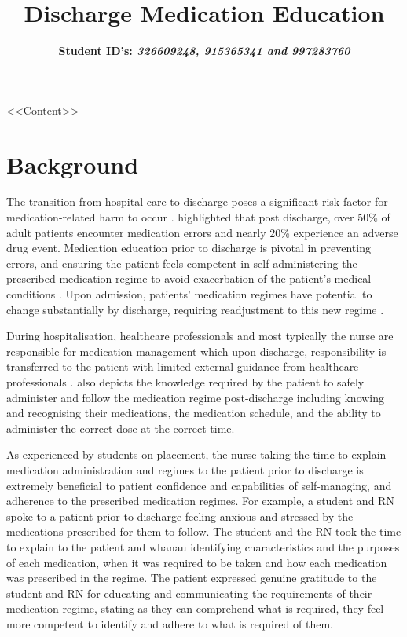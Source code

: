 \documentclass[british,12pt,a4paper]{article}
\title{{\fontsize{14}{15} \textbf{Discharge Medication Education}}\vspace{-1em}}
\author{{\fontsize{14}{15} \textbf{Student ID's: \textit{326609248, 915365341 and 997283760 }}}}
\date{}
\begin{document}
	\maketitle
	\thispagestyle{fancy}
	<<Content>>
	\section{Background}
	The transition from hospital care to discharge poses a significant risk factor for medication-related harm to occur \parencite{Flatman2021}. \textcite{Alqenae2020} highlighted that post discharge, over 50\% of adult patients encounter medication errors and nearly 20\% experience an adverse drug event. Medication education prior to discharge is pivotal in preventing errors, and ensuring the patient feels competent in self-administering the prescribed medication regime to avoid exacerbation of the patient's medical conditions \parencite{Hajialibeigloo2021}. Upon admission, patients' medication regimes have potential to change substantially by discharge, requiring readjustment to this new regime \parencite{Weir2020}. 

	During hospitalisation, healthcare professionals and most typically the nurse are responsible for medication management which upon discharge, responsibility is transferred to the patient with limited external guidance from healthcare professionals \parencite{Mortelmans2021}. \citeauthor{Mortelmans2021} also depicts the knowledge required by the patient to safely administer and follow the medication regime post-discharge including knowing and recognising their medications, the medication schedule, and the ability to administer the correct dose at the correct time. 

	As experienced by students on placement, the nurse taking the time to explain medication administration and regimes to the patient prior to discharge is extremely beneficial to patient confidence and capabilities of self-managing, and adherence to the prescribed medication regimes. For example, a student and RN spoke to a patient prior to discharge feeling anxious and stressed by the medications prescribed for them to follow. The student and the RN took the time to explain to the patient and whanau identifying characteristics and the purposes of each medication, when it was required to be taken and how each medication was prescribed in the regime. The patient expressed genuine gratitude to the student and RN for educating and communicating the requirements of their medication regime, stating as they can comprehend what is required, they feel more competent to identify and adhere to what is required of them. 
\end{document}
